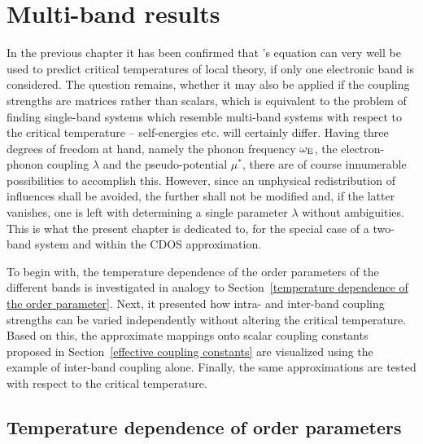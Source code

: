 
\chapter{Multi-band results}

In the previous chapter it has been confirmed that 's equation
can very well be used to predict critical temperatures of local
 theory, if only one electronic band is considered. The
question remains, whether it may also be applied if the coupling strengths are
matrices rather than scalars, which is equivalent to the problem of finding
single-band systems which resemble multi-band systems with respect to the
critical temperature -- self-energies etc. will certainly differ. Having three
degrees of freedom at hand, namely the phonon frequency $\omega \sb{\text{E}}$, the
electron-phonon coupling $\lambda$ and the  pseudo-potential
$\mu^*$, there are of course innumerable possibilities to accomplish this.
However, since an unphysical redistribution of influences shall be avoided, the
further shall not be modified and, if the latter vanishes, one is left with
determining a single parameter $\lambda$ without ambiguities. This is what the
present chapter is dedicated to, for the special case of a two-band system and
within the CDOS approximation.

To begin with, the temperature dependence of the order parameters of the
different bands is investigated in analogy to Section~\ref{temperature
dependence of the order parameter}. Next, it presented how intra- and inter-band
coupling strengths can be varied independently without altering the critical
temperature. Based on this, the approximate mappings onto scalar coupling
constants proposed in Section~\ref{effective coupling constants} are visualized
using the example of inter-band coupling alone. Finally, the same approximations
are tested with respect to the critical temperature.

\section{Temperature dependence of order parameters}
\label{temperature dependence of order parameters}

